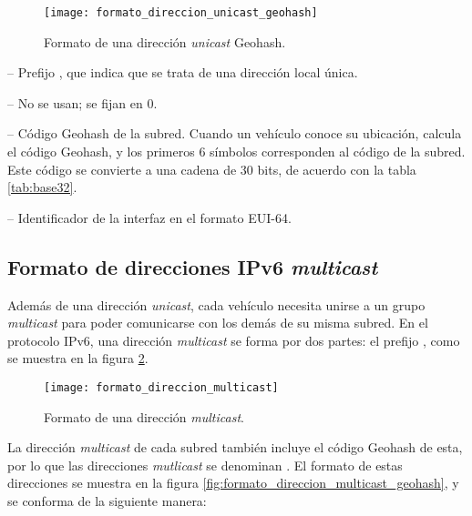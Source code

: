 \begin{figure}[th!]
\centering
\texttt{[image: formato\_direccion\_unicast\_geohash]}
\decoRule
\caption[Formato de una dirección \textit{unicast} Geohash]{Formato de una
dirección \textit{unicast} Geohash.}
\label{fig:formato_direccion_unicast_geohash}
\end{figure}

 -- Prefijo , que indica que se trata de
una dirección local única.

 -- No se usan; se fijan en 0.

 -- Código Geohash de la subred. Cuando un vehículo
conoce su ubicación, calcula el código Geohash, y los primeros 6 símbolos
corresponden al código de la subred. Este código se convierte a una cadena de
30 bits, de acuerdo con la tabla \ref{tab:base32}.

 -- Identificador de la interfaz en el formato
EUI-64.

\subsection{Formato de direcciones IPv6 \textit{multicast}}

\label{subsec:formato_direcciones_ipv6_multicast}

Además de una dirección \textit{unicast}, cada vehículo necesita unirse a un
grupo \textit{multicast} para poder comunicarse con los demás de su misma
subred. En el protocolo IPv6, una dirección \textit{multicast} se forma por dos
partes: el prefijo , como se muestra en la figura
\ref{fig:formato_direccion_multicast}.

\begin{figure}[th!]
\centering
\texttt{[image: formato\_direccion\_multicast]}
\decoRule
\caption[Formato de una dirección \textit{multicast}]{Formato de una dirección
\textit{multicast}.}
\label{fig:formato_direccion_multicast}
\end{figure}

La dirección \textit{multicast} de cada subred también incluye el código
Geohash de esta, por lo que las direcciones \textit{mutlicast} se denominan
. El formato de estas
direcciones se muestra en la figura
\ref{fig:formato_direccion_multicast_geohash}, y se conforma de la siguiente
manera:

